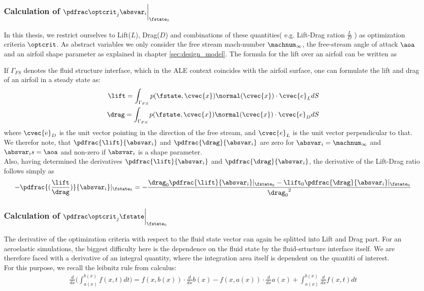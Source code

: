 \documentclass[../main.tex]{subfiles}
\begin{document}
\subsubsection{Calculation of $\PoptcritJBYabsvarI\bigg\rvert_{\fstate_0}$}
In this thesis, we restrict ourselves to Lift($L$), Drag($D$) and combinations of  these quantities( e.g. Lift-Drag ration $\frac{L}{D}$ ) as optimization criteria $\optcrit$. As abstract variables we only consider the free stream mach-number $\machnum_{\infty}$, the free-stream angle of attack $\aoa$ and an airfoil shape parameter as explained in chapter \ref{sec:design_model}.
The formula for the lift over an airfoil can be written as


If $\Gamma_{FS}$ denotes the fluid structure interface, which in the \ac{ALE} context coincides with the airfoil surface, one can formulate the lift and drag of an airfoil in a steady state as:
\begin{align}\label{eq:lift_and_drag_integrals}
\lift=\int_{\Gamma_{FS}} p(\fstate,\cvec{x}) \normal(\cvec{x})\cdot \cvec{e}_L dS \nonumber\\
\drag=\int_{\Gamma_{FS}} p(\fstate,\cvec{x}) \normal(\cvec{x})\cdot \cvec{e}_D dS \\
\end{align}
where $\cvec{e}_D$ is the unit vector pointing in the direction of the free stream, and $\cvec{e}_L$ is the unit vector perpendicular to that.
We therefor note, that $\pdfrac{\lift}{\absvar_i}$ and $\pdfrac{\drag}{\absvar_i}$ are zero for $\absvar_{i}=\machnum_{\infty}$ and $\absvar_{i}s=\aoa$ and non-zero if $\absvar_{i}$ is a shape parameter.\\
Also, having determined the derivatives $\pdfrac{\lift}{\absvar_i}$ and $\pdfrac{\drag}{\absvar_i}$, the derivative of the Lift-Drag ratio follows simply as
\begin{align}\label{eq:lifttoddrag_by_absvar}
-\pdfrac{(\frac{\lift}{\drag})}{\absvar_i}\rvert_{\fstate_0}=
-\frac{\drag_0 \pdfrac{\lift}{\absvar_i}\rvert_{\fstate_0} - \lift_0 \pdfrac{\drag}{\absvar_i}\rvert_{\fstate_0} }{{\drag_0}^2}
\end{align}


\subsubsection{Calculation of $\PoptcritJBYfstate\bigg\rvert_{\fstate_0}$}
The derivative of the optimization criteria with respect to the fluid state vector can again be splitted into Lift and Drag part.
For an aeroelastic simulations, the biggest difficulty here is the dependence on the fluid state by the fluid-srtucture interface itself.
We are therefore faced with a derivative of an integral quantity, where the integration area itself is dependent on the quantiti of interest.\\
For this purpose, we recall the leibnitz rule from calculus:
\begin{align}\label{eq:leibnitz_rule}
\frac{d}{dx}\Big(\int_{a(x)}^{b(x)} f(x,t) dt \Big) =
f(x,b(x))\cdot \frac{d}{dx}b(x)-
f(x,a(x))\cdot \frac{d}{dx}a(x)+
\int_{a(x)}^{b(x)} \frac{d}{dx} f(x,t) dt
\end{align}
\end{document}
